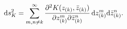\begin{equation}
{\rm d}s^2_K = \sum_{m,n\neq k}^{\infty}{\partial^2 K(z_{(k)}, {\bar z}_{(k)})\over
\partial z_{(k)}^m \partial {\bar z}_{(k)}^n}\, {\rm d}z_{(k)}^m{\rm d}{\bar z}_{(k)}^n.
\label{rrdd}
\end{equation}


